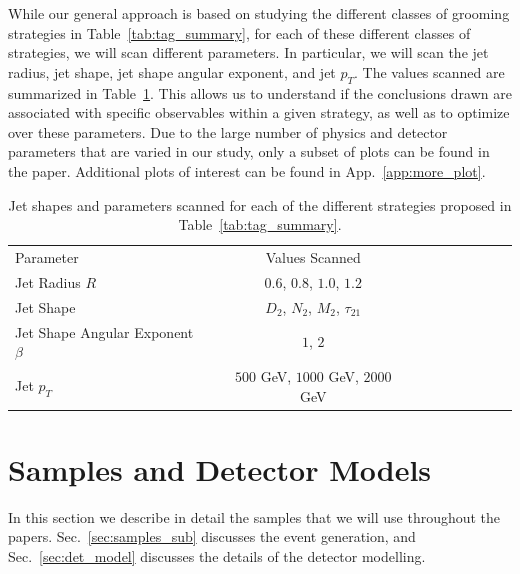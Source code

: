 \documentclass[11pt,letterpaper]{article}
\DeclareRobustCommand{\Sec}[1]{Sec.~\ref{#1}}
\DeclareRobustCommand{\App}[1]{App.~\ref{#1}}
\DeclareRobustCommand{\Tab}[1]{Table~\ref{#1}}
\begin{document}
While our general approach is based on studying the different classes of grooming strategies in \Tab{tab:tag_summary}, for each of these different classes of strategies, we will scan different parameters. In particular, we will scan the jet radius, jet shape, jet shape angular exponent, and jet $p_T$. The values scanned are summarized in \Tab{tab:params}. This allows us to understand if the conclusions drawn are associated with specific observables within a given strategy, as well as to optimize over these parameters. Due to the large number of physics and detector parameters that are varied in our study, only a subset of plots can be found in the paper. Additional plots of interest can be found in \App{app:more_plot}.



\begin{table}
\begin{center}
\begin{tabular}{| l | c | c |c |c|c|c |c|r| }
  \hline                       
  Parameter &  Values Scanned \\
  Jet Radius $R$ &   $0.6$, $0.8$, $1.0$, $1.2$  \\
  Jet Shape  &   $D_2$, $N_2$, $M_2$, $\tau_{21}$  \\
  Jet Shape Angular Exponent $\beta$ &   $1$, $2$ \\
  Jet $p_T$ &   $500$ GeV, $1000$ GeV, $2000$ GeV  \\
  \hline  
\end{tabular}
\end{center}
\caption{
Jet shapes and parameters scanned for each of the different strategies proposed in \Tab{tab:tag_summary}.
}
\label{tab:params}
\end{table}












\section{Samples and Detector Models}\label{sec:samples}


In this section we describe in detail the samples that we will use throughout the papers. \Sec{sec:samples_sub} discusses the event generation, and \Sec{sec:det_model} discusses the details of the detector modelling. 
\end{document}
